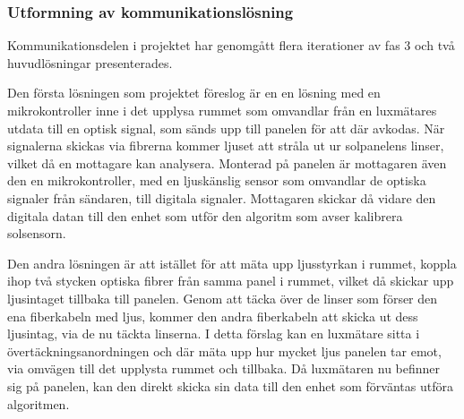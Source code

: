         \subsubsection{Utformning av kommunikationslösning} %
        \label{ssub:utformning_av_kommunikationslosning}
            Kommunikationsdelen i projektet har genomgått flera iterationer av fas 3 och två huvudlösningar presenterades.\bigskip 

            Den första lösningen som projektet föreslog är en en lösning med en mikrokontroller inne i det upplysa rummet som omvandlar från en luxmätares utdata till en optisk signal, som sänds upp till panelen  för att där avkodas. När signalerna skickas via fibrerna kommer ljuset att stråla ut ur solpanelens linser, vilket då en mottagare kan analysera. Monterad på panelen är mottagaren även den en mikrokontroller, med en ljuskänslig sensor som omvandlar de optiska signaler från sändaren, till digitala signaler. Mottagaren skickar då vidare den digitala datan till den enhet som utför den algoritm som avser kalibrera solsensorn. \bigskip

            Den andra lösningen är att istället för att mäta upp ljusstyrkan i rummet, koppla ihop två stycken optiska fibrer från samma panel i rummet, vilket då skickar upp ljusintaget tillbaka till panelen. Genom att täcka över de linser som förser den ena fiberkabeln med ljus, kommer den andra fiberkabeln att skicka ut dess ljusintag, via de nu täckta linserna. I detta förslag kan en luxmätare sitta i övertäckningsanordningen och där mäta upp hur mycket ljus panelen tar emot, via omvägen till det upplysta rummet och tillbaka. Då luxmätaren nu befinner sig på panelen, kan den direkt skicka sin data till den enhet som förväntas utföra algoritmen. %

